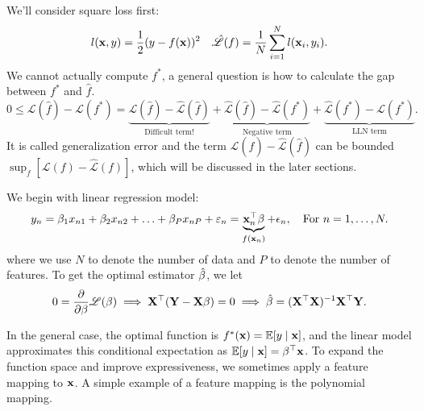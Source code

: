 We'll consider square loss first:
\[
l(\mathbf{x}, y) = \frac 1 2(y - f(\mathbf{x}))^2 \quad \hat{\mathcal{L}}(f) = \frac{1}{N} \sum_{i=1}^N l(\mathbf{x}_i,y_i).
\]
We cannot actually compute $f^*$, a general question is how to calculate the gap between $f^*$ and $\hat f$.
\[
0 \leq \mathscr{L}(\hat{f}) - \mathscr{L}(f^*)
= \underbrace{\mathscr{L}(\hat{f}) - \hat{\mathscr{L}}(\hat{f})}_{\text{Difficult term!}}
+ \underbrace{\hat{\mathscr{L}}(\hat{f}) - \hat{\mathscr{L}}(f^*)}_{\text{Negative term}}
+ \underbrace{\hat{\mathscr{L}}(f^*) - \mathscr{L}(f^*)}_{\text{LLN term}}.
\]
It is called generalization error and the term $\mathcal{L}(\hat f) - \hat{\mathcal{L}}(\hat f)$ can be bounded $\sup_{f} [\mathcal{L}(f) - \hat{\mathcal{L}}(f)]$, which will be discussed in the later sections.

We begin with linear regression model:
\[
y_n = \beta_1 x_{n1} + \beta_2 x_{n2} + \ldots + \beta_P x_{nP} + \varepsilon_n = \underbrace{\mathbf{x}_n^\top \mathbf{\beta}}_{f(\mathbf{x}_n)} + \epsilon_n, \quad \text{For } n = 1, \ldots, N.
\]
where we use $N$ to denote the number of data and $P$ to denote the number of features.
To get the optimal estimator $\hat{\mathbf{\beta}}$, we let
\[
0 = \frac{\partial}{\partial \mathbf{\beta}} \mathcal{L}(\mathbf{\beta}) \implies \mathbf{X}^\top (\mathbf{Y}-\mathbf{X}\mathbf{\beta})=0 \implies \hat{\mathbf{\beta}} = (\mathbf{X}^\top \mathbf{X})^{-1} \mathbf{X}^\top \mathbf{Y}.
\]

In the general case, the optimal function is $f^*(\mathbf{x}) = \mathbb{E}[y \mid \mathbf{x}]$, and the linear model approximates this conditional expectation as $\mathbb{E}[y \mid \mathbf{x}] = \mathbf{\beta}^\top \mathbf{x}$. To expand the function space and improve expressiveness, we sometimes apply a feature mapping to $\mathbf{x}$. A simple example of a feature mapping is the polynomial mapping.

